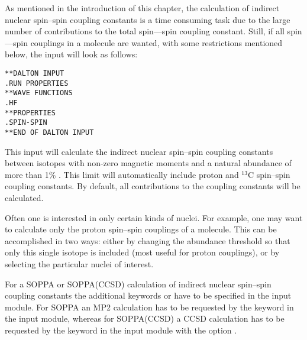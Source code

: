 \begin{center}
\end{center}

As mentioned in the introduction of this chapter, the calculation of
indirect nuclear
spin--spin coupling constants is a time consuming task due to the
large number of contributions to the total spin---spin coupling
constant. Still, if all spin---spin couplings in a molecule are wanted,
with some restrictions mentioned below, the input will look as
follows:

\begin{verbatim}
**DALTON INPUT
.RUN PROPERTIES
**WAVE FUNCTIONS
.HF
**PROPERTIES
.SPIN-SPIN
**END OF DALTON INPUT
\end{verbatim}

This input will calculate the indirect nuclear spin--spin
coupling
constants between isotopes with non-zero magnetic
moments and a
natural abundance of more than 1\% . This limit will
automatically
include proton and $^{13}$C spin--spin coupling constants. By default,
all contributions to the coupling constants will be calculated.

Often one is interested in only certain kinds of nuclei. For example,
 one may want to calculate only the proton spin--spin couplings of a molecule.
This can be accomplished in two ways: either by changing the abundance
threshold so that only this single isotope is included (most useful
for proton couplings), or by selecting the particular nuclei of interest.

For a SOPPA or SOPPA(CCSD) calculation of
indirect nuclear spin--spin coupling constants the additional keywords
 or  have to be specified in the 
input module. For SOPPA an MP2 calculation has to be requested by the keyword
 in the  input module, whereas for SOPPA(CCSD) a
CCSD calculation has to be requested by the keyword  in the  input module with the  option .

